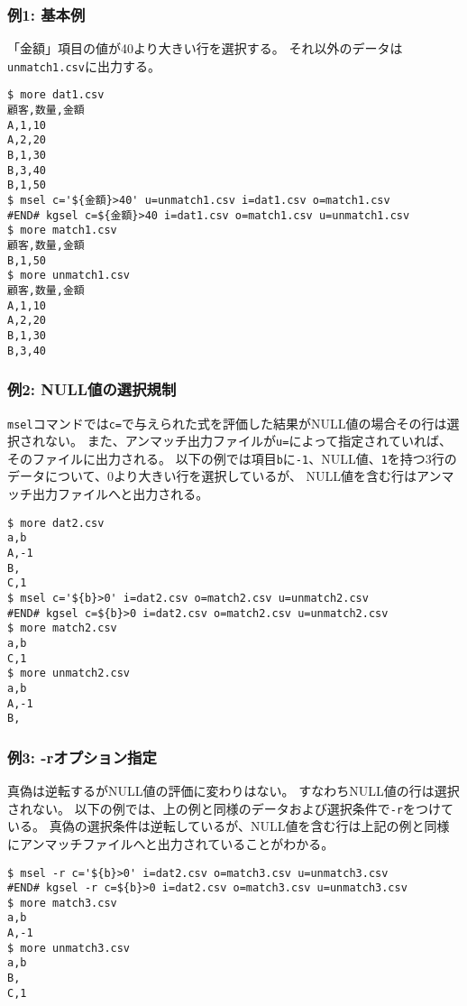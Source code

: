 \subsubsection*{例1: 基本例}

「金額」項目の値が40より大きい行を選択する。
それ以外のデータは\verb|unmatch1.csv|に出力する。


\begin{Verbatim}[baselinestretch=0.7,frame=single]
$ more dat1.csv
顧客,数量,金額
A,1,10
A,2,20
B,1,30
B,3,40
B,1,50
$ msel c='${金額}>40' u=unmatch1.csv i=dat1.csv o=match1.csv
#END# kgsel c=${金額}>40 i=dat1.csv o=match1.csv u=unmatch1.csv
$ more match1.csv
顧客,数量,金額
B,1,50
$ more unmatch1.csv
顧客,数量,金額
A,1,10
A,2,20
B,1,30
B,3,40
\end{Verbatim}
\subsubsection*{例2: NULL値の選択規制}

\verb|msel|コマンドでは\verb|c=|で与えられた式を評価した結果がNULL値の場合その行は選択されない。
また、アンマッチ出力ファイルが\verb|u=|によって指定されていれば、そのファイルに出力される。
以下の例では項目\verb|b|に\verb|-1|、NULL値、\verb|1|を持つ3行のデータについて、0より大きい行を選択しているが、
NULL値を含む行はアンマッチ出力ファイルへと出力される。


\begin{Verbatim}[baselinestretch=0.7,frame=single]
$ more dat2.csv
a,b
A,-1
B,
C,1
$ msel c='${b}>0' i=dat2.csv o=match2.csv u=unmatch2.csv
#END# kgsel c=${b}>0 i=dat2.csv o=match2.csv u=unmatch2.csv
$ more match2.csv
a,b
C,1
$ more unmatch2.csv
a,b
A,-1
B,
\end{Verbatim}
\subsubsection*{例3: -rオプション指定}

真偽は逆転するがNULL値の評価に変わりはない。
すなわちNULL値の行は選択されない。
以下の例では、上の例と同様のデータおよび選択条件で\verb|-r|をつけている。
真偽の選択条件は逆転しているが、NULL値を含む行は上記の例と同様にアンマッチファイルへと出力されていることがわかる。


\begin{Verbatim}[baselinestretch=0.7,frame=single]
$ msel -r c='${b}>0' i=dat2.csv o=match3.csv u=unmatch3.csv
#END# kgsel -r c=${b}>0 i=dat2.csv o=match3.csv u=unmatch3.csv
$ more match3.csv
a,b
A,-1
$ more unmatch3.csv
a,b
B,
C,1
\end{Verbatim}
